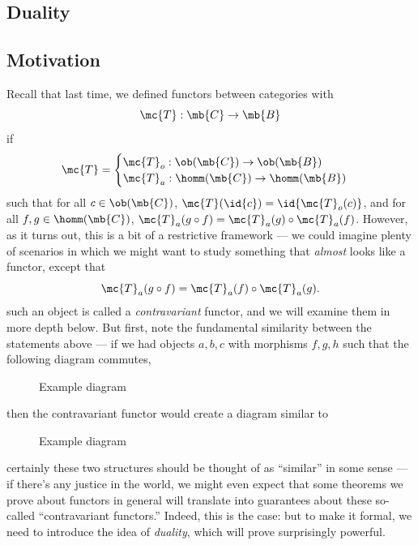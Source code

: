 \documentclass{fkbook}
\theoremstyle{snazzydefinition}
\begin{document}
\begin{adjustwidth}{1em}{1em}
  \section{Duality}
  \subsection{Motivation}
  Recall that last time, we defined functors between categories with
  \[
    \mc{T} : \mb{C} \to \mb{B}
  \]
  if
  \[
    \mc{T} =
    \begin{cases}
      \mc{T}_o : \ob(\mb{C}) \to \ob(\mb{B}) &  \\
      \mc{T}_a : \homm(\mb{C}) \to \homm(\mb{B}) &
    \end{cases}
  \]
  such that for all $c \in \ob(\mb{C})$, $\mc{T}(\id{c}) =
  \id{\mc{T}_o(c)}$, and for all $f,g \in \homm(\mb{C})$, $\mc{T}_a
  (g \circ f) = \mc{T}_a(g) \circ \mc{T}_a(f)$. However, as it turns
  out, this is a bit of a restrictive framework --- we could imagine
  plenty of scenarios in which we might want to study something that
  \emph{almost} looks like a functor, except that
  \[
    \mc{T}_a(g \circ f) = \mc{T}_a(f) \circ \mc{T}_a(g).
  \]
  such an object is called a \emph{contravariant} functor, and we will
  examine them in more depth below. But first, note the fundamental
  similarity between the statements above --- if we had objects
  $a,b,c$ with morphisms $f,g,h$ such that the following diagram
  commutes,
  \begin{figure}[H]
    \centering
    \tikzset{node distance=2cm, auto}
    \caption{Example diagram}
  \end{figure}
  then the contravariant functor would create a diagram similar to
  \begin{figure}[H]
    \centering
    \hspace{1.2cm}
    \tikzset{node distance=2cm, auto}
    \caption{Example diagram}
  \end{figure}
  certainly these two structures should be thought of as ``similar''
  in some sense --- if there's any justice in the world, we might even
  expect that some theorems we prove about functors in general will
  translate into guarantees about these so-called ``contravariant
  functors.'' Indeed, this is the case: but to make it formal, we need
  to introduce the idea of \emph{duality}, which will prove
  surprisingly powerful.

\end{adjustwidth}
\end{document}
